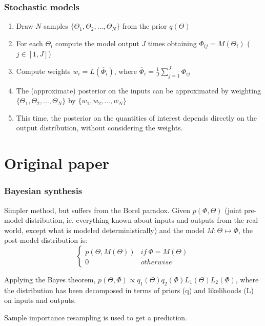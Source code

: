 \documentclass[aspectratio=43]{beamer}
\begin{document}
\begin{frame}
	\frametitle{Stochastic models}
	\begin{enumerate}
		\item Draw $N$ samples $\{\Theta_1, \Theta_2, \dots, \Theta_N\}$ from the prior $q(\Theta)$
		\item For each $\Theta_i$ compute the model output $J$ times obtaining $\Phi_{ij} = M(\Theta_i)$ ($j \in [1, J]$)
		\item Compute weights $w_i = L(\overline{\Phi}_i)$, where $\overline{\Phi}_i = \frac{1}{J}\displaystyle\sum_{j=1}^J \Phi_{ij}$
		\item The (approximate) posterior on the inputs can be approximated by weighting $\{\Theta_1, \Theta_2, \dots, \Theta_N\}$ by $\{w_1, w_2, \dots, w_N\}$
		\item This time, the posterior on the quantities of interest depends directly on the output distribution, without considering the weights.
	\end{enumerate}
\end{frame}



\section{Original paper~}
\begin{frame}
	\frametitle{Bayesian synthesis}
	Simpler method, but suffers from the Borel paradox. Given $p(\Phi, \Theta)$ (joint pre-model distribution, ie. everything known about inputs and outputs from the real world, except what is modeled deterministically) and the model $M: \Theta \mapsto \Phi$, the post-model distribution is:
	\begin{equation*}
		\begin{cases}
		p(\Theta, M(\Theta))&if\ \Phi = M(\Theta)\\
		0&otherwise
		\end{cases}
	\end{equation*}
	
	Applying the Bayes theorem, $p(\Theta, \Phi) \propto q_1(\Theta) q_2(\Phi) L_1(\Theta) L_2(\Phi)$, where the distribution has been decomposed in terms of priors (q) and likelihoods (L) on inputs and outputs.
	
	Sample importance resampling is used to get a prediction.
\end{frame}
\end{document}
